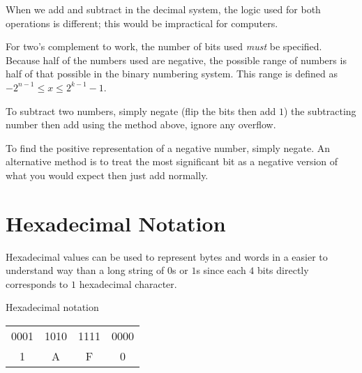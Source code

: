 When we add and subtract in the decimal system, the logic used for both operations is different; this would be impractical for computers.

For two's complement to work, the number of bits used \emph{must} be specified.
Because half of the numbers used are negative, the possible range of numbers is half of that possible in the binary numbering system.
This range is defined as \(-2^{n-1} \le x \le 2^{k-1} - 1\).

To subtract two numbers, simply negate (flip the bits then add \(1\)) the subtracting number then add using the method above, ignore any overflow.

To find the positive representation of a negative number, simply negate.
An alternative method is to treat the most significant bit as a negative version of what you would expect then just add normally.

\section{Hexadecimal Notation}\label{sec:hexadecimal_notation}

Hexadecimal values can be used to represent bytes and words in a easier to understand way than a long string of \(0\)s or \(1\)s since each \(4\) bits directly corresponds to \(1\) hexadecimal character.

\begin{highlight}{Hexadecimal notation}
	\begin{tabular}{c|c|c|c}
		0001 & 1010 & 1111 & 0000 \\
		1    & A    & F    & 0
	\end{tabular}
\end{highlight}

